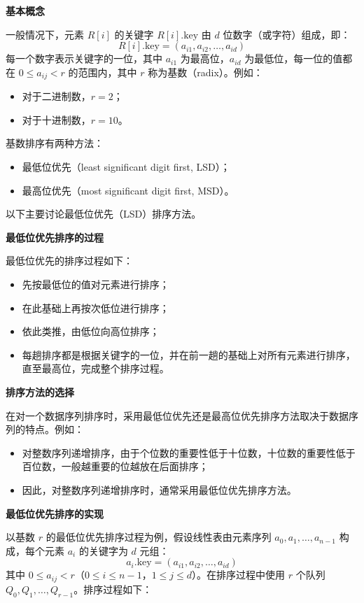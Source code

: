 \documentclass[lang=cn,newtx,10pt,scheme=chinese]{../elegantbook}
\begin{document}
\textbf{基本概念}  

一般情况下，元素 $R[i]$ 的关键字 $R[i].\text{key}$ 由 $d$ 位数字（或字符）组成，即：
\[
R[i].\text{key} = (a_{i1}, a_{i2}, \dots, a_{id})
\]
每一个数字表示关键字的一位，其中 $a_{i1}$ 为最高位，$a_{id}$ 为最低位，每一位的值都在 $0 \leq a_{ij} < r$ 的范围内，其中 $r$ 称为基数（radix）。例如：
\begin{itemize}
  \item 对于二进制数，$r = 2$；
  \item 对于十进制数，$r = 10$。
\end{itemize}

基数排序有两种方法：
\begin{itemize}
  \item 最低位优先（least significant digit first, LSD）；
  \item 最高位优先（most significant digit first, MSD）。
\end{itemize}
以下主要讨论最低位优先（LSD）排序方法。



\textbf{最低位优先排序的过程}  

最低位优先的排序过程如下：
\begin{itemize}
  \item 先按最低位的值对元素进行排序；
  \item 在此基础上再按次低位进行排序；
  \item 依此类推，由低位向高位排序；
  \item 每趟排序都是根据关键字的一位，并在前一趟的基础上对所有元素进行排序，直至最高位，完成整个排序过程。
\end{itemize}



\textbf{排序方法的选择}  

在对一个数据序列排序时，采用最低位优先还是最高位优先排序方法取决于数据序列的特点。例如：
\begin{itemize}
  \item 对整数序列递增排序，由于个位数的重要性低于十位数，十位数的重要性低于百位数，一般越重要的位越放在后面排序；
  \item 因此，对整数序列递增排序时，通常采用最低位优先排序方法。
\end{itemize}



\textbf{最低位优先排序的实现}  

以基数 $r$ 的最低位优先排序过程为例，假设线性表由元素序列 $a_0, a_1, \dots, a_{n-1}$ 构成，每个元素 $a_i$ 的关键字为 $d$ 元组：
\[
a_i.\text{key} = (a_{i1}, a_{i2}, \dots, a_{id})
\]
其中 $0 \leq a_{ij} < r$（$0 \leq i \leq n-1$，$1 \leq j \leq d$）。在排序过程中使用 $r$ 个队列 $Q_0, Q_1, \dots, Q_{r-1}$。排序过程如下：
\end{document}
